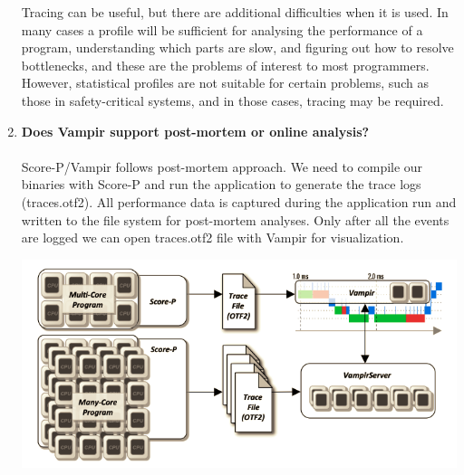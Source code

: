 \documentclass[10pt, letterpaper, twoside]{article}
\begin{document}
\begin{titlepage}
\begin{enumerate}
Tracing can be useful, but there are additional difficulties when it is used. In many cases a profile will be sufficient for analysing the performance of a program, understanding which parts are slow, and figuring out how to resolve bottlenecks, and these are the problems of interest to most programmers. However, statistical profiles are not suitable for certain problems, such as those in safety-critical systems, and in those cases, tracing may be required.


\item \textbf{Does Vampir support post-mortem or online analysis?}\\ \\
Score-P/Vampir follows post-mortem approach. We need to compile our binaries with Score-P and run the application to generate the trace logs (traces.otf2). All performance data is captured during the application run and written to
the file system for post-mortem analyses. Only after all the events are logged we can open traces.otf2 file with Vampir for visualization.

\includegraphics[scale = 0.5]{vampir.png}


\end{enumerate}
\end{titlepage}
\end{document}
